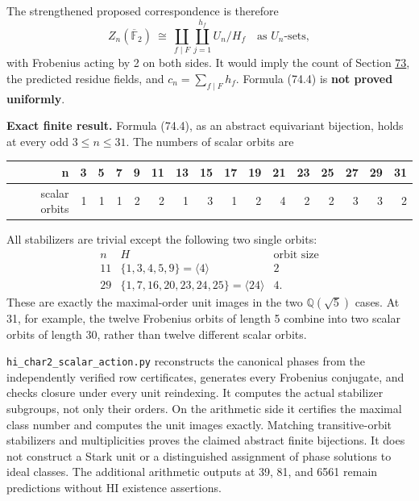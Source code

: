 \documentclass[11pt,reqno]{amsart}
\theoremstyle{plain}
\begin{document}
The strengthened proposed correspondence is therefore
\begin{equation*}
 \boxed{Z_n(\overline{\mathbb F}_2)
 \ \cong\ \coprod_{f\mid F}\coprod_{j=1}^{h_f} U_n/H_f}
 \quad\text{as }U_n\text{-sets},
 \tag{74.4}
\end{equation*}
with Frobenius acting by 2 on both sides. It would imply the count of
Section \hyperref[sec:73]{73}, the predicted residue fields, and
\(c_n=\sum_{f\mid F}h_f\). Formula (74.4) is \textbf{not proved uniformly}.

\textbf{Exact finite result.} Formula (74.4), as an abstract equivariant
bijection, holds at every odd \(3\le n\le31\). The numbers of scalar
orbits are

\begin{center}\small
\begin{tabular}{@{}rrrrrrrrrrrrrrrr@{}}
\toprule
n & 3 & 5 & 7 & 9 & 11 & 13 & 15 & 17 & 19 & 21 & 23 & 25 & 27 & 29 & 31 \\
\midrule
scalar orbits & 1 & 1 & 1 & 2 & 2 & 1 & 3 & 1 & 2 & 4 & 2 & 2 & 3 & 3 & 2 \\
\bottomrule
\end{tabular}
\end{center}

All stabilizers are trivial except the following two single orbits:
\[
 \begin{array}{c|c|c}
 n&H&\text{orbit size}\\\hline
 11&\{1,3,4,5,9\}=\langle4\rangle&2\\
 29&\{1,7,16,20,23,24,25\}=\langle24\rangle&4.
 \end{array}
\]
These are exactly the maximal-order unit images in the two
\(\mathbb Q(\sqrt5)\) cases. At 31, for example, the twelve Frobenius
orbits of length 5 combine into two scalar orbits of length 30, rather
than twelve different scalar orbits.

\texttt{hi\_\allowbreak char2\_\allowbreak scalar\_\allowbreak action.py} reconstructs the canonical phases from the
independently verified row certificates, generates every Frobenius
conjugate, and checks closure under every unit reindexing. It computes
the actual stabilizer subgroups, not only their orders. On the arithmetic
side it certifies the maximal class number and computes the unit images
exactly. Matching transitive-orbit stabilizers and multiplicities proves
the claimed abstract finite bijections. It does not construct a Stark
unit or a distinguished assignment of phase solutions to ideal classes.
The additional arithmetic outputs at 39, 81, and 6561 remain predictions
without HI existence assertions.
\end{document}
